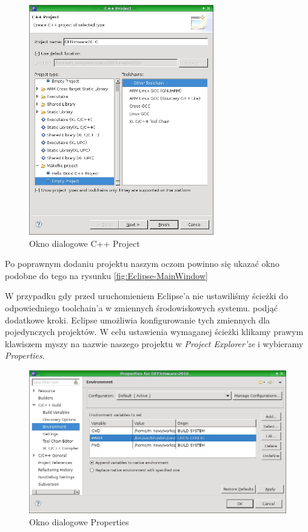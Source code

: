 \begin{figure}[h!]
 \centering
 \includegraphics[height=100.0mm]{../images/ch03/Eclipse-CPP-Project.jpg}
 \caption{Okno dialogowe C++ Project}
 \label{fig:Eclipse-CPP-Project}
\end{figure}

Po poprawnym dodaniu projektu naszym oczom powinno się ukazać okno podobne do
tego na rysunku \ref{fig:Eclipse-MainWindow}

W przypadku gdy przed uruchomieniem Eclipse'a nie ustawiliśmy ścieżki do
odpowiedniego toolchain'a w zmiennych środowiskowych systemu. podjąć dodatkowe
kroki. Eclipse umożliwia konfigurowanie tych zmiennych dla pojedynczych
projektów. W celu ustawienia wymaganej ścieżki klikamy prawym klawiszem myszy na
nazwie naszego projektu w \textit{Project Explorer'ze} i wybieramy
\textit{Properties}.

\begin{figure}[h!]
 \centering
 \includegraphics[width=150.0mm]{../images/ch03/Eclipse-Project-Properties.jpg}
 \caption{Okno dialogowe Properties}
 \label{fig:Eclipse-Project-Properties}
\end{figure}

